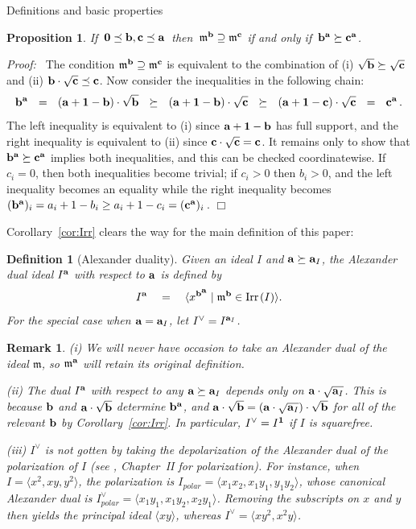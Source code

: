 \documentclass[12pt,leqno]{article}
\newtheorem{defn}[thm]{Definition}
\newtheorem{prop}[thm]{Proposition}
\newtheorem{remark}[thm]{Remark}
\def\<{{\langle}}
\def\>{{\rangle}}
\def\Irr{{\rm Irr}{\scriptscriptstyle \,}}
\def\aa{{{\rm \bf a}}}
\def\bb{{{\rm \bf b}}}
\def\cc{{{\rm \bf c}}}
\def\mm{{\mathfrak m}}
\begin{document}
\begin{section}{Definitions and basic properties}
\begin{prop} \label{prop:irr_order}
If \,${\bf 0} \preceq \bb,\cc \preceq \aa$\, then \,$\mm^\bb \supseteq
\mm^\cc$ if and only if \,$\bb^\aa \succeq \cc^\aa$.
\end{prop}
{\it Proof:\ } The condition $\mm^\bb \supseteq \mm^\cc$ is equivalent to
the combination of (i) $\sqrt\bb \succeq \sqrt\cc$ and (ii) $\bb \cdot
\sqrt\cc \preceq \cc$.  Now consider the inequalities in the following
chain:
$$
	\bb^\aa\ \ =\ \ (\aa + {\bf 1} - \bb) \cdot \sqrt\bb
	\ \ \succeq\ \  (\aa + {\bf 1} - \bb) \cdot \sqrt\cc
	\ \ \succeq\ \  (\aa + {\bf 1} - \cc) \cdot \sqrt\cc
	\ \ =\ \ \cc^\aa\,.
$$
The left inequality is equivalent to (i) since $\aa + {\bf 1} - \bb$ has
full support, and the right inequality is equivalent to (ii) since $\cc
\cdot \sqrt\cc = \cc$.  It remains only to show that $\bb^\aa \succeq
\cc^\aa$ implies both inequalities, and this can be checked
coordinatewise.  If $c_i = 0$, then both inequalities become trivial; if
$c_i > 0$ then $b_i > 0$, and the left inequality becomes an equality
while the right inequality becomes $(\bb^\aa)_i = a_i + 1 - b_i \geq a_i
+ 1 - c_i = (\cc^\aa)_i$\,.  \hfill $\Box$
\vskip 2mm

Corollary~\ref{cor:Irr} clears the way for the main definition of this
paper:

\begin{defn}[Alexander duality] \label{defn:alexdual}
Given an ideal $I$ and $\aa \succeq \aa_I$, the \emph{Alexander dual
ideal $I^\aa$ with respect to $\aa$} is defined by
$$
	I^\aa \quad = \quad \<x^{\bb^{\scriptstyle \aa}} \mid \mm^\bb
	\in \Irr(I)\>.
$$
For the special case when $\aa = \aa_I$, let $I^\vee = I^{\aa_I}$.
\end{defn}

\begin{remark} \label{rk:alexdual} \rm
(i) We will never have occasion to take an Alexander dual of the ideal
$\mm$, so $\mm^\aa$ will retain its original definition.
\vskip 1mm

\noindent
(ii) The dual $I^\aa$ with respect to any $\aa \succeq \aa_I$ depends
only on $\aa \cdot \sqrt{\aa_I}$.  This is because $\bb$ and $\aa \cdot
\sqrt{\bb}$ determine $\bb^\aa$, and $\aa \cdot \sqrt\bb = (\aa \cdot
\sqrt{\aa_I}) \cdot \sqrt\bb$ for all of the relevant $\bb$ by
Corollary~\ref{cor:Irr}.  In particular, $I^\vee = I^{\bf 1}$ if $I$ is
squarefree.
\vskip 1mm

\noindent
(iii) $I^\vee$ is not gotten by taking the depolarization of the
Alexander dual of the polarization of $I$ (see \cite{SV}, Chapter~II for
polarization).  For instance, when $I = \<x^2, xy, y^2\>$, the
polarization is $I_{polar} = \<x_1x_2, x_1y_1, y_1y_2\>$, whose canonical
Alexander dual is $I_{polar}^\vee = \<x_1y_1, x_1y_2, x_2y_1\>$.
Removing the subscripts on $x$ and $y$ then yields the principal ideal
$\<xy\>$, whereas $I^\vee = \<xy^2, x^2y\>$.
\end{remark}


\end{section}
\end{document}

